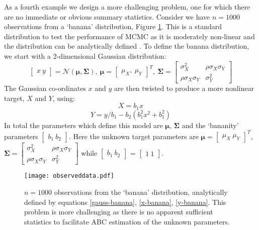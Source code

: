 As a fourth example we design a more challenging problem, one for which there are no immediate or obvious summary statistics. Consider we have $n = 1000$ observations from a `banana' distribution, Figure \ref{banana-data}. This is a standard distribution to test the performance of MCMC as it is moderately non-linear and the distribution can be analytically defined \citep{Haario1999}. To define the banana distribution, we start with a 2-dimensional Gaussian distribution:
\begin{equation}
\begin{bmatrix}
x\ y
\end{bmatrix}=\mathcal{N}(\bm{\mu},\bm{\Sigma}),\ \bm{\mu} = \begin{bmatrix}
\mu_X,\ \mu_Y
\end{bmatrix}^T,\ \bm{\Sigma} = \begin{bmatrix}
\sigma^2_X & \rho\sigma_X\sigma_Y\\
\rho\sigma_X\sigma_Y & \sigma^2_Y
\end{bmatrix} 
\label{gauss-banana}
\end{equation}
The Gaussian co-ordinates $x$ and $y$ are then twisted to produce a more nonlinear target, $X$ and $Y$, using:
\begin{equation}
X = b_1x
\label{x-banana}
\end{equation}
\begin{equation}
Y = y/b_1-b_2(b_1^2x^2+b_1^2)
\label{y-banana}
\end{equation}
In total the parameters which define this model are $\bm{\mu}$, $\bm{\Sigma}$ and the `bananity' parameters $\begin{bmatrix}
b_1\ b_2
\end{bmatrix}$. Here the unknown target parameters are $\bm{\mu} = \begin{bmatrix}
\mu_X\ \mu_Y
\end{bmatrix}^T$,
$\bm{\Sigma} = \begin{bmatrix}
\sigma^2_X & \rho\sigma_X\sigma_Y\\
\rho\sigma_X\sigma_Y & \sigma^2_Y
\end{bmatrix}$ while $\begin{bmatrix}
b_1\ b_2
\end{bmatrix}$ = $\begin{bmatrix}
1\ 1
\end{bmatrix}$. 

\begin{figure}[H]
\centering
\texttt{[image: observeddata.pdf]}
\caption{$n = 1000$ observations from the `banana' distribution, analytically defined by equations \ref{gauss-banana}, \ref{x-banana}, \ref{y-banana}. 
This problem is more challenging as there is no apparent sufficient statistics to facilitate ABC estimation of the unknown parameters.}
\label{banana-data}
\end{figure}


